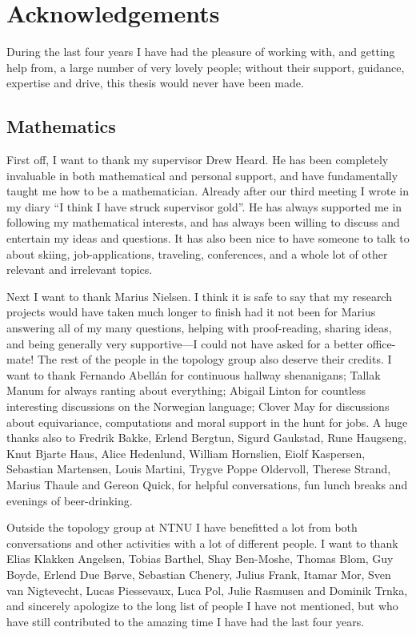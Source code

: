 
\section*{Acknowledgements}

During the last four years I have had the pleasure of working with, and getting help from, a large number of very lovely people; without their support, guidance, expertise and drive, this thesis would never have been made. 

\subsection*{Mathematics}

First off, I want to thank my supervisor Drew Heard. He has been completely invaluable in both mathematical and personal support, and have fundamentally taught me how to be a mathematician. Already after our third meeting I wrote in my diary ``I think I have struck supervisor gold''. He has always supported me in following my mathematical interests, and has always been willing to discuss and entertain my ideas and questions. It has also been nice to have someone to talk to about skiing, job-applications, traveling, conferences, and a whole lot of other relevant and irrelevant topics. 

Next I want to thank Marius Nielsen. I think it is safe to say that my research projects would have taken much longer to finish had it not been for Marius answering all of my many questions, helping with proof-reading, sharing ideas, and being generally very supportive---I could not have asked for a better office-mate! The rest of the people in the topology group also deserve their credits. I want to thank Fernando Abellán for continuous hallway shenanigans; Tallak Manum for always ranting about everything; Abigail Linton for countless interesting discussions on the Norwegian language; Clover May for discussions about equivariance, computations and moral support in the hunt for jobs. A huge thanks also to 
Fredrik Bakke, 
Erlend Bergtun, 
Sigurd Gaukstad, 
Rune Haugseng,
Knut Bjarte Haus, 
Alice Hedenlund, 
William Hornslien, 
Eiolf Kaspersen, 
Sebastian Martensen, 
Louis Martini,
Trygve Poppe Oldervoll, 
Therese Strand, 
Marius Thaule and 
Gereon Quick, 
for helpful conversations, fun lunch breaks and evenings of beer-drinking.

Outside the topology group at NTNU I have benefitted a lot from both conversations and other activities with a lot of different people. I want to thank 
Elias Klakken Angelsen, 
Tobias Barthel, 
Shay Ben-Moshe, 
Thomas Blom, 
Guy Boyde,
Erlend Due Børve, 
Sebastian Chenery, 
Julius Frank, 
Itamar Mor, 
Sven van Nigtevecht, 
Lucas Piessevaux, 
Luca Pol, 
Julie Rasmusen and 
Dominik Trnka, 
and sincerely apologize to the long list of people I have not mentioned, but who have still contributed to the amazing time I have had the last four years. 


